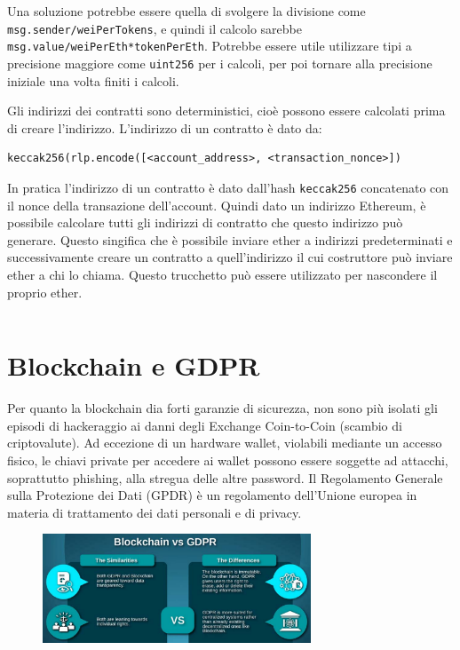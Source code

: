 Una soluzione potrebbe essere quella di svolgere la divisione come \texttt{msg.sender/weiPerTokens}, e quindi il calcolo sarebbe \texttt{msg.value/weiPerEth*tokenPerEth}. Potrebbe essere utile utilizzare tipi a precisione maggiore come \texttt{uint256} per i calcoli, per poi tornare alla precisione iniziale una volta finiti i calcoli.

\vspace{5mm}

Gli indirizzi dei contratti sono deterministici, cioè possono essere calcolati prima di creare l'indirizzo. L'indirizzo di un contratto è dato da:
\begin{lstlisting}[language=Solidity]
keccak256(rlp.encode([<account_address>, <transaction_nonce>])
\end{lstlisting}
In pratica l'indirizzo di un contratto è dato dall'hash \texttt{keccak256} concatenato con il nonce della transazione dell'account. Quindi dato un indirizzo Ethereum, è possibile calcolare tutti gli indirizzi di contratto che questo indirizzo può generare. Questo singifica che è possibile inviare ether a indirizzi predeterminati e successivamente creare un contratto a quell'indirizzo il cui costruttore può inviare ether a chi lo chiama. Questo trucchetto può essere utilizzato per nascondere il proprio ether.
\begin{lstlisting}[language=Solidity]

\end{lstlisting}
\section{Blockchain e GDPR}
Per quanto la blockchain dia forti
garanzie di sicurezza, non sono più
isolati gli episodi di hackeraggio ai
danni degli Exchange Coin-to-Coin
(scambio di criptovalute).
Ad eccezione di un hardware wallet, violabili mediante un accesso
fisico, le chiavi private per accedere ai wallet possono essere soggette
ad attacchi, soprattutto phishing, alla stregua delle altre password.
Il Regolamento Generale sulla
Protezione dei Dati (GPDR) è
un regolamento dell'Unione
europea in materia di
trattamento dei dati personali
e di privacy.

\begin{figure}[htb!]
    \centering
    \includegraphics[width=8cm]{./Images/cap5/5.9.png}
\end{figure}

